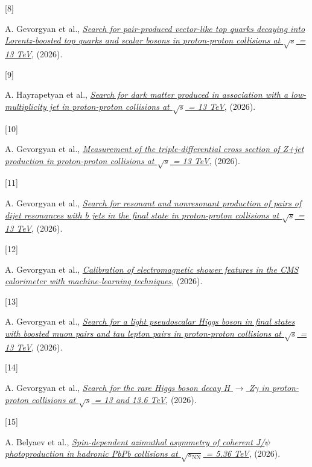 \documentclass[
]{article}
\newlength{\cslhangindent}
\newlength{\csllabelwidth}
\newenvironment{CSLReferences}[2] %
 {\begin{list}{}{%
  \setlength{\itemindent}{0pt}
  \setlength{\leftmargin}{0pt}
  \setlength{\parsep}{0pt}
  \ifodd #1
   \setlength{\leftmargin}{\cslhangindent}
   \setlength{\itemindent}{-1\cslhangindent}
  \fi
  \setlength{\itemsep}{#2\baselineskip}}}
 {\end{list}}
\newcommand{\CSLLeftMargin}[1]{\parbox[t]{\csllabelwidth}{\strut#1\strut}}
\newcommand{\CSLRightInline}[1]{\parbox[t]{\linewidth - \csllabelwidth}{\strut#1\strut}}
\begin{document}
\begin{CSLReferences}{0}{0}
\CSLLeftMargin{{[}8{]} }%
\CSLRightInline{A. Gevorgyan et al.,
\emph{\href{https://arxiv.org/abs/2610.03489}{{Search for pair-produced
vector-like top quarks decaying into Lorentz-boosted top quarks and
scalar bosons in proton-proton collisions at \(\sqrt{s}\) = 13 TeV}}},
(2026).}

\CSLLeftMargin{{[}9{]} }%
\CSLRightInline{A. Hayrapetyan et al.,
\emph{\href{https://arxiv.org/abs/2610.00995}{{Search for dark matter
produced in association with a low-multiplicity jet in proton-proton
collisions at \(\sqrt{s}\) = 13 TeV}}}, (2026).}

\CSLLeftMargin{{[}10{]} }%
\CSLRightInline{A. Gevorgyan et al.,
\emph{\href{https://arxiv.org/abs/2609.39653}{{Measurement of the
triple-differential cross section of Z+jet production in proton-proton
collisions at \(\sqrt{s}\) = 13 TeV}}}, (2026).}

\CSLLeftMargin{{[}11{]} }%
\CSLRightInline{A. Gevorgyan et al.,
\emph{\href{https://arxiv.org/abs/2609.21850}{{Search for resonant and
nonresonant production of pairs of dijet resonances with b jets in the
final state in proton-proton collisions at \(\sqrt{s}\) = 13 TeV}}},
(2026).}

\CSLLeftMargin{{[}12{]} }%
\CSLRightInline{A. Gevorgyan et al.,
\emph{\href{https://arxiv.org/abs/2609.15377}{{Calibration of
electromagnetic shower features in the CMS calorimeter with
machine-learning techniques}}}, (2026).}

\CSLLeftMargin{{[}13{]} }%
\CSLRightInline{A. Gevorgyan et al.,
\emph{\href{https://arxiv.org/abs/2609.12683}{{Search for a light
pseudoscalar Higgs boson in final states with boosted muon pairs and tau
lepton pairs in proton-proton collisions at \(\sqrt{s}\) = 13 TeV}}},
(2026).}

\CSLLeftMargin{{[}14{]} }%
\CSLRightInline{A. Gevorgyan et al.,
\emph{\href{https://arxiv.org/abs/2609.04402}{{Search for the rare Higgs
boson decay H \(\to\) Z\(\ensuremath{\gamma}\) in proton-proton collisions at \(\sqrt{s}\)
= 13 and 13.6 TeV}}}, (2026).}

\CSLLeftMargin{{[}15{]} }%
\CSLRightInline{A. Belyaev et al.,
\emph{\href{https://arxiv.org/abs/2609.04376}{{Spin-dependent azimuthal
asymmetry of coherent J/\(\ensuremath{\psi}\) photoproduction in hadronic PbPb
collisions at \(\sqrt{s_\mathrm{NN}}\) = 5.36 TeV}}}, (2026).}


\end{CSLReferences}
\end{document}
